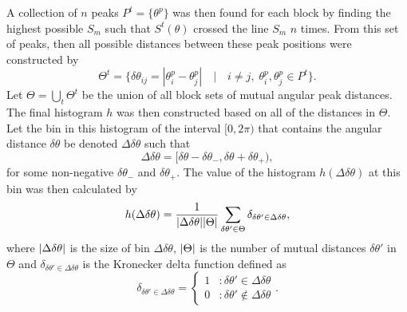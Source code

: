 A collection of $n$ peaks $P^t = \{\theta^p\}$ was then found for each block by finding the highest possible $S_m$ such that $S^t(\theta)$ crossed the line $S_m$ $n$ times. From this set of peaks,
then all possible distances between these peak positions were constructed by
\begin{equation}
    \label{eq:Vor:Symm:AH:mutualDistances}
    \Theta^t = \{\delta\theta_{ij} = |\theta^p_i-\theta^p_j|\quad|\quad i\neq j,\;\theta_i^p,\theta_j^p\in P^t\}.
\end{equation}
Let $\Theta = \bigcup_t\Theta^t$ be the union of all block sets of mutual angular peak distances. The final histogram $h$ was then constructed based on all of the distances in $\Theta$. Let the bin
in this histogram of the interval $[0,2\pi)$ that contains the angular distance $\delta\theta$ be denoted $\Delta\delta\theta$ such that 
\begin{equation}
    \label{eq:Vor:Symm:AH:mutualDistancesBin}
    \Delta\delta\theta = [\delta\theta-\delta\theta_-,\delta\theta+\delta\theta_+),
\end{equation}
for some non-negative $\delta\theta_-$ and $\delta\theta_+$. The value of the histogram $h(\Delta\delta\theta)$ at this bin was then calculated by
\begin{equation}
    h(\Delta\delta\theta) = \frac{1}{\lvert \Delta\delta\theta \rvert\lvert \Theta \rvert}\sum_{\delta\theta'\in\Theta}\delta_{\delta\theta'\in\Delta\delta\theta},
\end{equation}
where $\lvert \Delta\delta\theta \rvert$ is the size of bin $\Delta\delta\theta$, $\lvert \Theta \rvert$ is the number of mutual distances $\delta\theta'$ in $\Theta$
and $\delta_{\delta\theta'\in\Delta\delta\theta}$ is the Kronecker delta function defined as
\begin{equation}
    \label{eq:Vor:Symm:AH:kroneckerDelta}
    \delta_{\delta\theta'\in\Delta\delta\theta} = \left\{
    \begin{array}{lr}
        1 & : \delta\theta'\in\Delta\delta\theta \\
        0 & : \delta\theta'\notin\Delta\delta\theta
    \end{array}\right. .
\end{equation}



